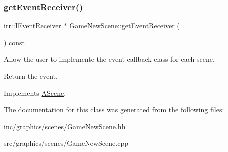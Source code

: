 \subsubsection{\texorpdfstring{get\+Event\+Receiver()}{getEventReceiver()}}
{\footnotesize\ttfamily \hyperlink{classirr_1_1IEventReceiver}{irr\+::\+I\+Event\+Receiver} $\ast$ Game\+New\+Scene\+::get\+Event\+Receiver (\begin{DoxyParamCaption}{ }\end{DoxyParamCaption}) const\hspace{0.3cm}{\ttfamily [virtual]}}



Allow the user to implemente the event callback class for each scene. 

Return the event. 

Implements \hyperlink{classAScene_af521e5e6d30a5d2e5d30eb333e4d3abd}{A\+Scene}.



The documentation for this class was generated from the following files\+:\begin{DoxyCompactItemize}
\item 
inc/graphics/scenes/\hyperlink{GameNewScene_8hh}{Game\+New\+Scene.\+hh}\item 
src/graphics/scenes/Game\+New\+Scene.\+cpp\end{DoxyCompactItemize}
